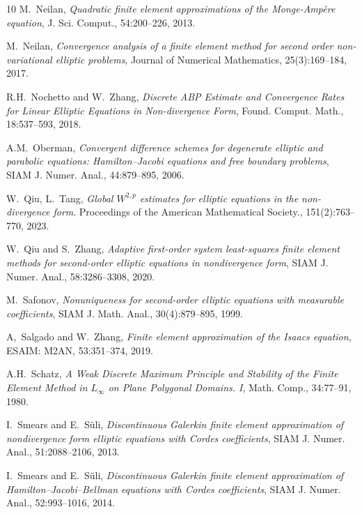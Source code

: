 \documentclass[12pt]{amsart}
\theoremstyle{definition}
\theoremstyle{remark}
\begin{document}
\begin{thebibliography}{10}
{\sc M.~Neilan}, {\em Quadratic finite element approximations of the 
Monge-Amp\`{e}re equation}, J. Sci. Comput., 54:200--226, 2013.

{\sc M.~Neilan}, {\em Convergence analysis of a finite element method for second order non-variational elliptic problems}, 
Journal of Numerical Mathematics, 25(3):169--184, 2017.

{\sc R.H.~Nochetto and W.~Zhang}, {\em Discrete ABP Estimate and Convergence Rates 
for Linear Elliptic Equations in Non-divergence Form}, Found. Comput. Math., 18:537--593, 2018.

{\sc A.M.~Oberman}, {\em Convergent difference schemes for degenerate elliptic 
and parabolic equations: Hamilton–Jacobi equations and free boundary problems}, 
SIAM J. Numer. Anal., 44:879--895, 2006.
  
{\sc W.~Qiu, L.~Tang}, {\em Global $W^{2,p}$ estimates for elliptic equations in the non-divergence form}. 
Proceedings of the American Mathematical Society., 151(2):763--770, 2023.  

{\sc W.~Qiu and S.~Zhang}, {\em Adaptive first-order system least-squares finite element methods for second-order 
elliptic equations in nondivergence form}, SIAM J. Numer. Anal., 58:3286--3308, 2020.

{\sc M.~Safonov}, {\em Nonuniqueness for second-order elliptic equations with 
measurable coefficients}, SIAM J. Math. Anal., 30(4):879--895, 1999. 

{\sc A,~Salgado and W.~Zhang}, {\em Finite element approximation of the Isaacs equation}, 
ESAIM: M2AN, 53:351--374, 2019.

{\sc A.H.~Schatz}, {\em A Weak Discrete Maximum Principle and Stability of the Finite Element Method in 
$L_{\infty}$ on Plane Polygonal Domains. I}, Math. Comp., 34:77--91, 1980.

{\sc I.~Smears and E.~S\"uli}, {\em Discontinuous Galerkin finite element 
approximation of nondivergence form elliptic equations with Cordes coefficients}, 
SIAM J. Numer. Anal., 51:2088--2106, 2013. 

{\sc I.~Smears and E.~S\"uli}, {\em Discontinuous Galerkin finite element 
approximation of Hamilton--Jacobi--Bellman equations with Cordes coefficients}, 
SIAM J. Numer. Anal., 52:993--1016, 2014.


\end{thebibliography}
\end{document}
